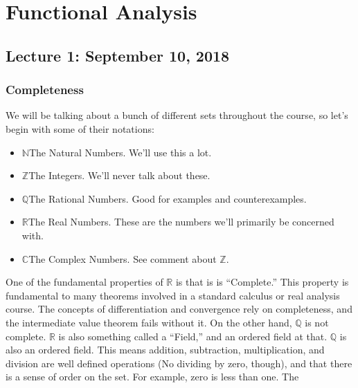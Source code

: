 \documentclass[crop=false,class=article,oneside]{standalone}
\begin{document}
    \ifx\iffunct\undefined
        \section*{Functional Analysis}
        \setcounter{section}{1}
    \fi
    \subsection{Lecture 1: September 10, 2018}
        \subsubsection{Completeness}
            We will be talking about a bunch of different sets
            throughout the course, so let's begin with some of
            their notations:
            \begin{itemize}
                \item $\mathbb{N}$\quad The Natural Numbers.
                      We'll use this a lot.
                \item $\mathbb{Z}$\quad The Integers.
                      We'll never talk about these.
                \item $\mathbb{Q}$\quad The Rational Numbers.
                      Good for examples and counterexamples.
                \item $\mathbb{R}$\quad The Real Numbers.
                      These are the numbers we'll primarily
                      be concerned with.
                \item $\mathbb{C}$\quad The Complex Numbers.
                      See comment about $\mathbb{Z}$.
            \end{itemize}
            One of the fundamental properties of $\mathbb{R}$ is
            that is is ``Complete.'' This property is fundamental
            to many theorems involved in a standard calculus or
            real analysis course. The concepts of differentiation
            and convergence rely on completeness, and the
            intermediate value theorem fails without it. On the
            other hand, $\mathbb{Q}$ is not complete. $\mathbb{R}$
            is also something called a ``Field,'' and an ordered
            field at that. $\mathbb{Q}$ is also an ordered field.
            This means addition, subtraction, multiplication, and
            division are well defined operations (No dividing by
            zero, though), and that there is a sense of order on
            the set. For example, zero is less than one. The
\end{document}
